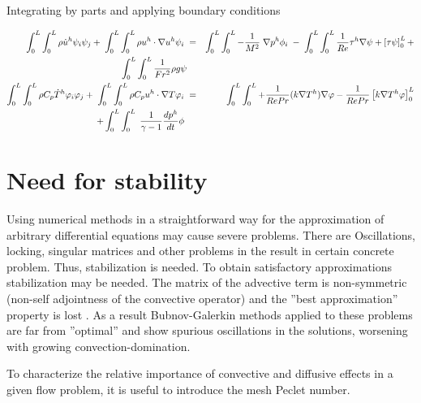 Integrating by parts and applying boundary conditions

\begin{eqnarray*}
\int_{0}^{L} \int_{0}^{L}\rho \dot{u}^h \psi_i \psi_j + \hspace{1mm}\int_{0}^{L} \int_{0}^{L} \rho u^h \cdot \nabla u^h \psi_i \hspace{1mm} &=& \int_{0}^{L} \int_{0}^{L}  -\frac{1}{M^2}\hspace{1mm}\nabla p^h \phi_i \hspace{1mm} - \hspace{1mm}\int_{0}^{L} \int_{0}^{L}\frac{1}{Re} \tau^h \nabla \psi + \left[\tau \psi \right]_0^L+ \\ \int_{0}^{L} \int_{0}^{L}\frac{1}{Fr^2}\rho g \psi \\
\int_{0}^{L} \int_{0}^{L} \rho C_p \dot{T}^h \varphi_i \varphi_j + \hspace{1mm}\int_{0}^{L} \int_{0}^{L} \rho C_p u^h \cdot \nabla T \varphi_i \hspace{1mm}&=&\hspace{1mm} \int_{0}^{L} \int_{0}^{L} +  \frac{1}{Re Pr}(k \nabla T^h) \nabla \varphi  -  \frac{1}{Re Pr} \left[k \nabla T^h \varphi \right]_0^L \\ + \int_{0}^{L} \int_{0}^{L} \hspace{1mm} \frac{1}{\gamma -1} \frac{d p^h}{d t} \phi\hspace{1mm} \\
\end{eqnarray*}

\section{Need for stability}
Using numerical methods in a straightforward way for the approximation of arbitrary differential
equations may cause severe problems. There are Oscillations, locking, singular matrices and other problems in the result in certain concrete problem.
Thus, stabilization is needed. To obtain satisfactory approximations stabilization may be needed. The matrix of the advective term is non-symmetric (non-self adjointness of the convective operator) and the ”best approximation” property is lost . As a result Bubnov-Galerkin methods applied to these problems are far from ”optimal” and show spurious oscillations in the solutions, worsening with growing convection-domination. 

\noindent To characterize the relative importance of convective and diffusive effects in a given flow
problem, it is useful to introduce the mesh Peclet number.

